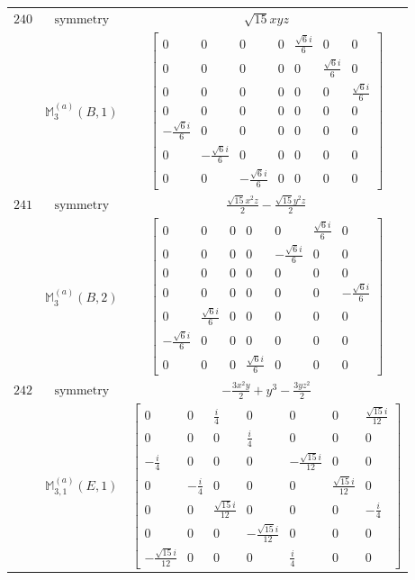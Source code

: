 \documentclass[fleqn,8pt,landscape]{jsarticle}
\begin{document}
\begin{longtable}{ccc}
$ 240 $ & $ \text{symmetry} $ & $ \sqrt{15} x y z $ \\
$  $ & $ \mathbb{M}_{3}^{(a)}(B,1) $ & $ \begin{bmatrix} 0 & 0 & 0 & 0 & \frac{\sqrt{6} i}{6} & 0 & 0 \\ 0 & 0 & 0 & 0 & 0 & \frac{\sqrt{6} i}{6} & 0 \\ 0 & 0 & 0 & 0 & 0 & 0 & \frac{\sqrt{6} i}{6} \\ 0 & 0 & 0 & 0 & 0 & 0 & 0 \\ - \frac{\sqrt{6} i}{6} & 0 & 0 & 0 & 0 & 0 & 0 \\ 0 & - \frac{\sqrt{6} i}{6} & 0 & 0 & 0 & 0 & 0 \\ 0 & 0 & - \frac{\sqrt{6} i}{6} & 0 & 0 & 0 & 0 \end{bmatrix} $ \\ \hline
$ 241 $ & $ \text{symmetry} $ & $ \frac{\sqrt{15} x^{2} z}{2} - \frac{\sqrt{15} y^{2} z}{2} $ \\
$  $ & $ \mathbb{M}_{3}^{(a)}(B,2) $ & $ \begin{bmatrix} 0 & 0 & 0 & 0 & 0 & \frac{\sqrt{6} i}{6} & 0 \\ 0 & 0 & 0 & 0 & - \frac{\sqrt{6} i}{6} & 0 & 0 \\ 0 & 0 & 0 & 0 & 0 & 0 & 0 \\ 0 & 0 & 0 & 0 & 0 & 0 & - \frac{\sqrt{6} i}{6} \\ 0 & \frac{\sqrt{6} i}{6} & 0 & 0 & 0 & 0 & 0 \\ - \frac{\sqrt{6} i}{6} & 0 & 0 & 0 & 0 & 0 & 0 \\ 0 & 0 & 0 & \frac{\sqrt{6} i}{6} & 0 & 0 & 0 \end{bmatrix} $ \\ \hline
$ 242 $ & $ \text{symmetry} $ & $ - \frac{3 x^{2} y}{2} + y^{3} - \frac{3 y z^{2}}{2} $ \\
$  $ & $ \mathbb{M}_{3,1}^{(a)}(E,1) $ & $ \begin{bmatrix} 0 & 0 & \frac{i}{4} & 0 & 0 & 0 & \frac{\sqrt{15} i}{12} \\ 0 & 0 & 0 & \frac{i}{4} & 0 & 0 & 0 \\ - \frac{i}{4} & 0 & 0 & 0 & - \frac{\sqrt{15} i}{12} & 0 & 0 \\ 0 & - \frac{i}{4} & 0 & 0 & 0 & \frac{\sqrt{15} i}{12} & 0 \\ 0 & 0 & \frac{\sqrt{15} i}{12} & 0 & 0 & 0 & - \frac{i}{4} \\ 0 & 0 & 0 & - \frac{\sqrt{15} i}{12} & 0 & 0 & 0 \\ - \frac{\sqrt{15} i}{12} & 0 & 0 & 0 & \frac{i}{4} & 0 & 0 \end{bmatrix} $ \\ \hline

\end{longtable}
\end{document}
